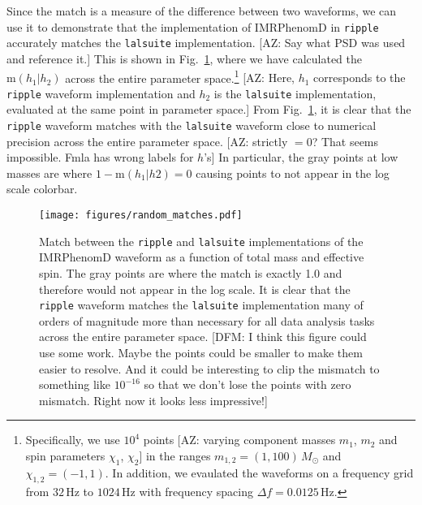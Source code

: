 \documentclass[twocolumn]{aastex631}
\newcommand{\ripple}{\texttt{ripple}\xspace}
\newcommand{\lalsuite}{\texttt{lalsuite}\xspace}
\newcommand{\AZ}[1]{{\color{Burnt}[AZ: #1]}}
\newcommand{\dfm}[1]{{\color{dfm}[DFM: #1]}}
\begin{document}
Since the match is a measure of the difference between two waveforms, we can use it to demonstrate that the implementation of IMRPhenomD in \ripple accurately matches the \lalsuite implementation.
\AZ{Say what PSD was used and reference it.}
This is shown in Fig.~\ref{fig:match}, where we have calculated the $\mathrm{m}(h_1|h_2)$ across the entire parameter space.\footnote{
    Specifically, we use $10^4$ points \AZ{varying component masses $m_1$, $m_2$ and spin parameters $\chi_1$, $\chi_2$} in the ranges $m_{1,2} = (1,100)\,M_{\odot}$ and $\chi_{1,2} = (-1,1)$. In addition, we evaulated the waveforms on a frequency grid from $32\,$Hz to $1024\,$Hz with frequency spacing $\Delta f = 0.0125 \,$Hz.
}
\AZ{Here, $h_1$ corresponds to the \ripple waveform implementation and $h_2$ is the \lalsuite implementation, evaluated at the same point in parameter space.} 
From Fig.~\ref{fig:match}, it is clear that the \ripple waveform matches with the \lalsuite waveform close to numerical precision across the entire parameter space.
\AZ{strictly $=0$? That seems impossible. Fmla has wrong labels for $h$'s}
In particular, the gray points at low masses are where $1-\mathrm{m}(h_1|h2)=0$ causing points to not appear in the log scale colorbar.
\begin{figure}[t]
    \begin{centering}
        \texttt{[image: figures/random\_matches.pdf]}
        \caption{
            Match between the \ripple and \lalsuite implementations of the IMRPhenomD waveform as a function of total mass and effective spin. 
            The gray points are where the match is exactly 1.0 and therefore would not appear in the log scale.
            It is clear that the \ripple waveform matches the \lalsuite implementation many of orders of magnitude more than necessary for all data analysis tasks across the entire parameter space.
            \dfm{I think this figure could use some work. Maybe the points could be smaller to make them easier to resolve. And it could be interesting to clip the mismatch to something like $10^{-16}$ so that we don't lose the points with zero mismatch. Right now it looks less impressive!}
        }
        \label{fig:match}
    \end{centering}
\end{figure}
\end{document}
